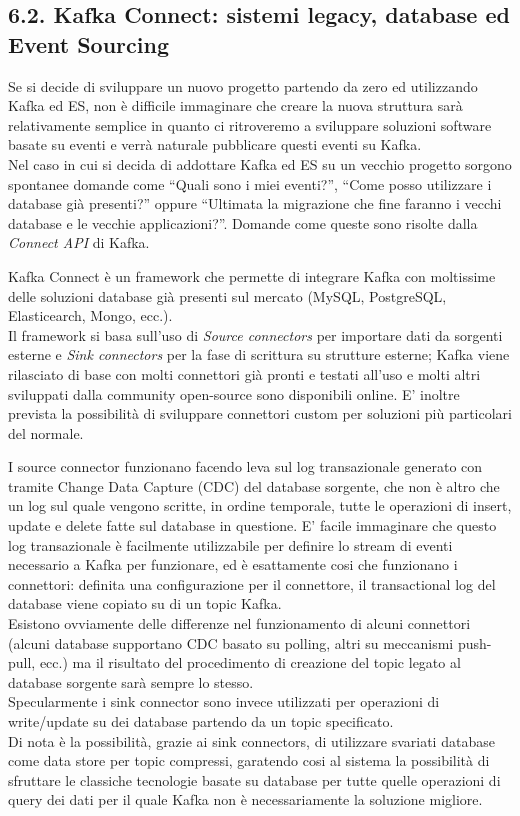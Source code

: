 \documentclass[]{article}
\begin{document}
\subsection{6.2. Kafka Connect: sistemi legacy, database ed Event
Sourcing}\label{kafka-connect-sistemi-legacy-database-ed-event-sourcing}

Se si decide di sviluppare un nuovo progetto partendo da zero ed
utilizzando Kafka ed ES, non è difficile immaginare che creare la nuova
struttura sarà relativamente semplice in quanto ci ritroveremo a
sviluppare soluzioni software basate su eventi e verrà naturale
pubblicare questi eventi su Kafka.\\
Nel caso in cui si decida di addottare Kafka ed ES su un vecchio
progetto sorgono spontanee domande come ``Quali sono i miei eventi?'',
``Come posso utilizzare i database già presenti?'' oppure ``Ultimata la
migrazione che fine faranno i vecchi database e le vecchie
applicazioni?''. Domande come queste sono risolte dalla \emph{Connect
API} di Kafka.

Kafka Connect è un framework che permette di integrare Kafka con
moltissime delle soluzioni database già presenti sul mercato (MySQL,
PostgreSQL, Elasticearch, Mongo, ecc.).\\
Il framework si basa sull'uso di \emph{Source connectors} per importare
dati da sorgenti esterne e \emph{Sink connectors} per la fase di
scrittura su strutture esterne; Kafka viene rilasciato di base con molti
connettori già pronti e testati all'uso e molti altri sviluppati dalla
community open-source sono disponibili online. E' inoltre prevista la
possibilità di sviluppare connettori custom per soluzioni più
particolari del normale.

I source connector funzionano facendo leva sul log transazionale
generato con tramite Change Data Capture (CDC) del database sorgente,
che non è altro che un log sul quale vengono scritte, in ordine
temporale, tutte le operazioni di insert, update e delete fatte sul
database in questione. E' facile immaginare che questo log transazionale
è facilmente utilizzabile per definire lo stream di eventi necessario a
Kafka per funzionare, ed è esattamente cosi che funzionano i connettori:
definita una configurazione per il connettore, il transactional log del
database viene copiato su di un topic Kafka.\\
Esistono ovviamente delle differenze nel funzionamento di alcuni
connettori (alcuni database supportano CDC basato su polling, altri su
meccanismi push-pull, ecc.) ma il risultato del procedimento di
creazione del topic legato al database sorgente sarà sempre lo stesso.\\
Specularmente i sink connector sono invece utilizzati per operazioni di
write/update su dei database partendo da un topic specificato.\\
Di nota è la possibilità, grazie ai sink connectors, di utilizzare
svariati database come data store per topic compressi, garatendo cosi al
sistema la possibilità di sfruttare le classiche tecnologie basate su
database per tutte quelle operazioni di query dei dati per il quale
Kafka non è necessariamente la soluzione migliore.
\end{document}
